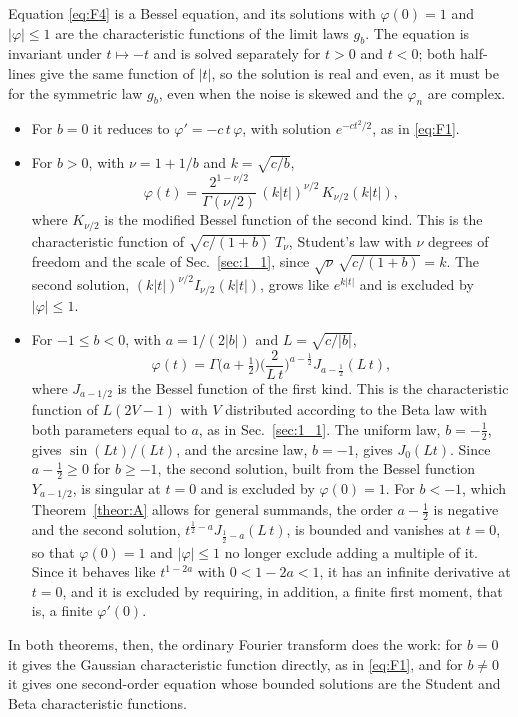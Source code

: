 \documentclass[aip,jmp,preprint,onecolumn,floatfix,superscriptaddress,nofootinbib,11pt]{revtex4-2}
\theoremstyle{plain}
\theoremstyle{remark}
\numberwithin{equation}{section}
\begin{document}
Equation \eqref{eq:F4} is a Bessel equation, and its solutions with $\varphi(0)=1$ and $|\varphi|\le1$ are the characteristic functions of the limit laws $g_b$. The equation is invariant under $t\mapsto-t$ and is solved separately for $t>0$ and $t<0$; both half-lines give the same function of $|t|$, so the solution is real and even, as it must be for the symmetric law $g_b$, even when the noise is skewed and the $\varphi_n$ are complex.
\begin{itemize}
\item For $b=0$ it reduces to $\varphi'=-c\,t\,\varphi$, with solution $e^{-ct^{2}/2}$, as in \eqref{eq:F1}.
\item For $b>0$, with $\nu=1+1/b$ and $k=\sqrt{c/b}$,
\begin{equation*}
\varphi(t)=\frac{2^{1-\nu/2}}{\Gamma(\nu/2)}\,(k|t|)^{\nu/2}\,K_{\nu/2}(k|t|),
\end{equation*}
where $K_{\nu/2}$ is the modified Bessel function of the second kind. This is the characteristic function of $\sqrt{c/(1+b)}\;T_\nu$, Student's law with $\nu$ degrees of freedom and the scale of Sec.~\ref{sec:1_1}, since $\sqrt\nu\,\sqrt{c/(1+b)}=k$. The second solution, $(k|t|)^{\nu/2}I_{\nu/2}(k|t|)$, grows like $e^{k|t|}$ and is excluded by $|\varphi|\le1$.
\item For $-1\le b<0$, with $a=1/(2|b|)$ and $L=\sqrt{c/|b|}$,
\begin{equation*}
\varphi(t)=\Gamma\big(a+\tfrac12\big)\Big(\frac{2}{L\,t}\Big)^{a-\frac12}J_{a-\frac12}(L\,t),
\end{equation*}
where $J_{a-1/2}$ is the Bessel function of the first kind. This is the characteristic function of $L(2V-1)$ with $V$ distributed according to the Beta law with both parameters equal to $a$, as in Sec.~\ref{sec:1_1}. The uniform law, $b=-\tfrac12$, gives $\sin(Lt)/(Lt)$, and the arcsine law, $b=-1$, gives $J_0(Lt)$. Since $a-\tfrac12\ge0$ for $b\ge-1$, the second solution, built from the Bessel function $Y_{a-1/2}$, is singular at $t=0$ and is excluded by $\varphi(0)=1$. For $b<-1$, which Theorem~\ref{theor:A} allows for general summands, the order $a-\tfrac12$ is negative and the second solution, $t^{\frac12-a}J_{\frac12-a}(L\,t)$, is bounded and vanishes at $t=0$, so that $\varphi(0)=1$ and $|\varphi|\le1$ no longer exclude adding a multiple of it. Since it behaves like $t^{1-2a}$ with $0<1-2a<1$, it has an infinite derivative at $t=0$, and it is excluded by requiring, in addition, a finite first moment, that is, a finite $\varphi'(0)$.
\end{itemize}
In both theorems, then, the ordinary Fourier transform does the work: for $b=0$ it gives the Gaussian characteristic function directly, as in \eqref{eq:F1}, and for $b\neq0$ it gives one second-order equation whose bounded solutions are the Student and Beta characteristic functions.
 
\end{document}
